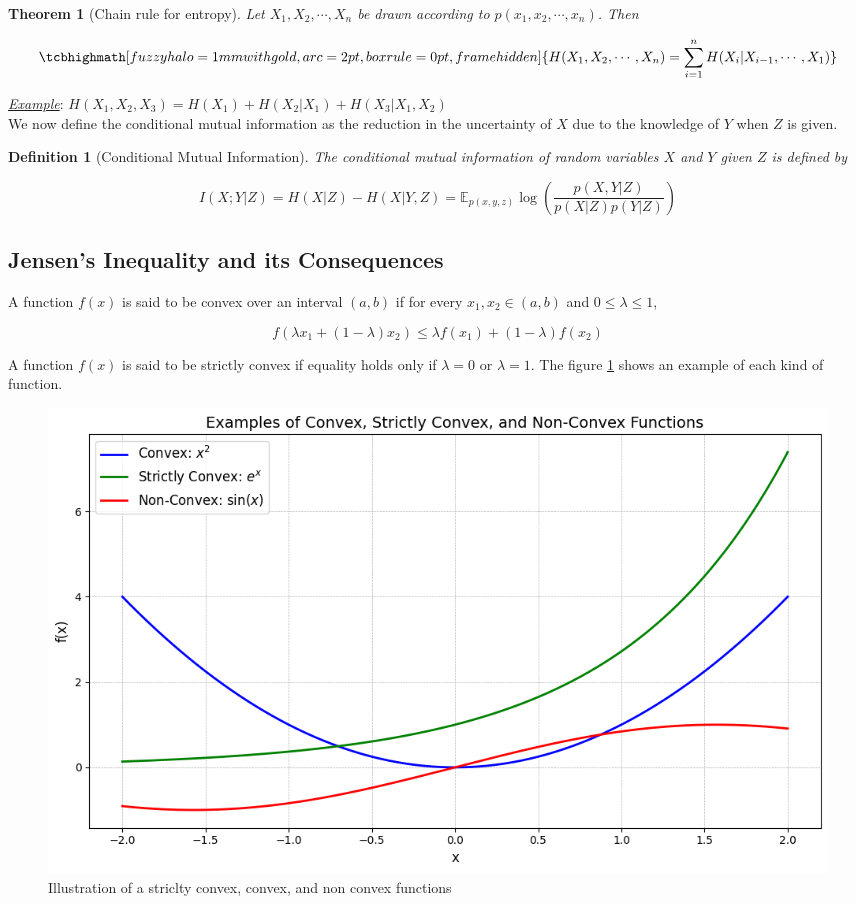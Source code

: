 \documentclass[a4paper,10pt]{article}
\newtheorem{theorem}{Theorem}
\newcommand{\equationgold}[1]{
  \tcbhighmath[fuzzy halo=1mm with gold,arc=2pt,boxrule=0pt,frame hidden]{#1}
}
\newtheorem{definition}{Definition}[section] %
\newcommand{\hlt}[1]{\colorbox{color3}{#1}}
\begin{document}
\begin{theorem}[Chain rule for entropy]
    Let $X_1, X_2, \cdots, X_n$ be drawn according to $p(x_1, x_2, \cdots, x_n)$. Then

    \begin{equation}
        \equationgold{
            H(X_1, X_2, \cdots, X_n) = \sum_{i=1}^{n}H(X_i | X_{i-1}, \cdots, X_1)
        }
    \end{equation}
\end{theorem}

\noindent\underline{\textit{Example}}: $H(X_1, X_2, X_3) = H(X_1) + H(X_2 | X_1) + H(X_3 | X_1, X_2)$\\

We now define the conditional mutual information as the reduction in the uncertainty of $X$ due to the knowledge of $Y$ when $Z$ is given.

\begin{definition}[Conditional Mutual Information]
    The conditional mutual information of random variables $X$ and $Y$ given $Z$ is defined by

    \begin{equation}
        I(X; Y | Z) = H(X | Z) - H(X | Y, Z) = \mathbb{E}_{p(x, y, z)}\log\left(\frac{p(X, Y | Z)}{p(X | Z)p(Y | Z)}\right)
    \end{equation}
\end{definition}

\subsection{Jensen's Inequality and its Consequences}

A function $f(x)$ is said to be \hlt{convex} over an interval $(a, b)$ if for every $x_1, x_2 \in (a, b)$ and $0 \leq \lambda \leq 1$,

\begin{equation}
    f(\lambda x_1 + (1 - \lambda)x_2) \leq \lambda f(x_1) + (1 - \lambda)f(x_2)
\end{equation}

A function $f(x)$ is said to be strictly convex if equality holds only if $\lambda = 0$ or $\lambda = 1$. The figure \ref{fig:convex_function} shows an example of each kind of function.

\begin{figure}[ht]
    \centering
    \includegraphics[width=0.5\linewidth]{Figures/convex_function.png}
    \caption{Illustration of a striclty convex, convex, and non convex functions}
    \label{fig:convex_function}
\end{figure}
\end{document}
